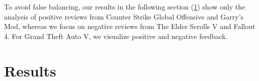 \documentclass{article}
\theoremstyle{plain}
\theoremstyle{definition}
\theoremstyle{remark}
\begin{document}

To avoid false balancing, our results in the following section (\ref{sec:results}) show only the analysis of positive reviews from Counter Strike Global Offensive and Garry's Mod, whereas we focus on negative reviews from The Elder Scrolls V and Fallout 4. For Grand Theft Auto V, we visualize positive and negative feedback.


% 
\newpage
\section{Results}\label{sec:results}
\end{document}
